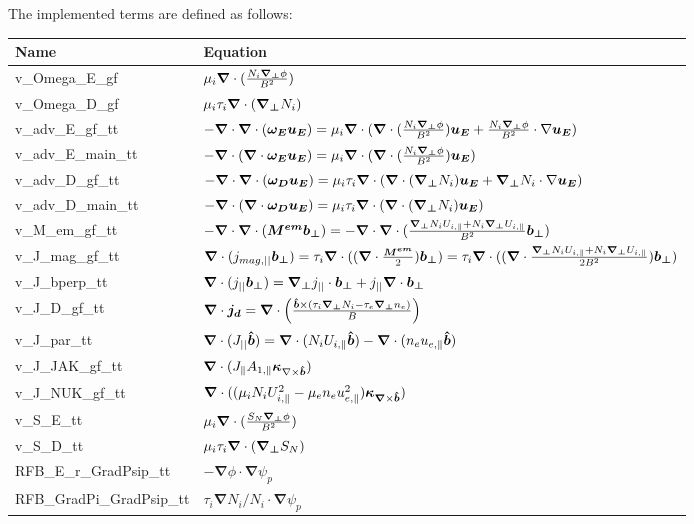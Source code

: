 The implemented terms are defined as follows:
\begin{longtable}{ll}
\toprule
\rowcolor{gray!50}\textbf{Name} &  \textbf{Equation}\\
\midrule
    v\_Omega\_E\_gf &$ \mu_i{\boldsymbol{\nabla}}\cdot(\frac{N_i\boldsymbol{\nabla_\perp}\phi}{B^2})$ \\
    v\_Omega\_D\_gf &$ \mu_i\tau_i {\boldsymbol{\nabla}}\cdot(\boldsymbol{\nabla_\perp} N_i)$ \\
    v\_adv\_E\_gf\_tt &$ -{\boldsymbol{\nabla}}\cdot{\boldsymbol{\nabla}}\cdot(\boldsymbol{\omega_E u_E})=\mu_i{\boldsymbol{\nabla}}\cdot({\boldsymbol{\nabla}}\cdot (\frac{N_i\boldsymbol{\nabla_\perp}\phi}{B^2})\boldsymbol{u_E}+\frac{N_i\boldsymbol{\nabla_\perp}\phi}{B^2}\cdot\nabla \boldsymbol{u_E})  $\\
    v\_adv\_E\_main\_tt &$ -{\boldsymbol{\nabla}}\cdot({\boldsymbol{\nabla}}\cdot\boldsymbol{\omega_E u_E})=\mu_i{\boldsymbol{\nabla}}\cdot({\boldsymbol{\nabla}}\cdot (\frac{N_i\boldsymbol{\nabla_\perp}\phi}{B^2})\boldsymbol{u_E})   $\\
    v\_adv\_D\_gf\_tt &$  -{\boldsymbol{\nabla}}\cdot{\boldsymbol{\nabla}}\cdot(\boldsymbol{\omega_D u_E})=\mu_i\tau_i {\boldsymbol{\nabla}}\cdot({\boldsymbol{\nabla}}\cdot (\boldsymbol{\nabla_\perp} N_i)\boldsymbol{u_E}+\boldsymbol{\nabla_\perp} N_i\cdot\nabla \boldsymbol{u_E})  $\\
    v\_adv\_D\_main\_tt &$  -{\boldsymbol{\nabla}}\cdot({\boldsymbol{\nabla}}\cdot\boldsymbol{\omega_D u_E})=\mu_i\tau_i {\boldsymbol{\nabla}}\cdot({\boldsymbol{\nabla}}\cdot (\boldsymbol{\nabla_\perp} N_i)\boldsymbol{u_E})   $\\
    v\_M\_em\_gf\_tt &$  -{\boldsymbol{\nabla}}\cdot{\boldsymbol{\nabla}}\cdot(\boldsymbol{M^{em}}\boldsymbol{b_\perp})=-{\boldsymbol{\nabla}}\cdot{\boldsymbol{\nabla}}\cdot(\frac{\boldsymbol{\nabla_\perp} N_i U_{i,\parallel}+ N_i\boldsymbol{\nabla_\perp} U_{i,\parallel}}{B^2} \boldsymbol{b_\perp}) $\\
    v\_J\_mag\_gf\_tt &$ {\boldsymbol{\nabla}}\cdot(j_{mag,||}\boldsymbol{b_\perp})=\tau_i{\boldsymbol{\nabla}}\cdot(({\boldsymbol{\nabla}}\cdot\frac{\boldsymbol{M^{em}}}{2})\boldsymbol{b_\perp})=\tau_i{\boldsymbol{\nabla}}\cdot(({\boldsymbol{\nabla}}\cdot\frac{\boldsymbol{\nabla_\perp} N_i U_{i,\parallel}+ N_i\boldsymbol{\nabla_\perp} U_{i,\parallel}}{2B^2})\boldsymbol{b_\perp})  $\\
    v\_J\_bperp\_tt &$ {\boldsymbol{\nabla}}\cdot(j_{||}\boldsymbol{b_\perp})=\boldsymbol{\nabla_\perp} j_{||}\cdot\boldsymbol{b_\perp}+j_{||}{\boldsymbol{\nabla}}\cdot\boldsymbol{b_\perp}  $\\
    v\_J\_D\_gf\_tt &$ {\boldsymbol{\nabla}}\cdot\boldsymbol{j_d}= {\boldsymbol{\nabla}}\cdot\left(\frac{\bm{\hat{b}}\times(\tau_i\boldsymbol{\nabla_\perp} N_i-\tau_e\boldsymbol{\nabla_\perp} n_e)}{B}\right) $\\
    v\_J\_par\_tt &$ {\boldsymbol{\nabla}}\cdot(J_{||}\boldsymbol{\bm{\hat{b}}})={\boldsymbol{\nabla}}\cdot(N_i U_{i,\parallel}\bm{\hat{b}})-{\boldsymbol{\nabla}}\cdot(n_e u_{e,\parallel}\bm{\hat{b}})  $\\
    v\_J\_JAK\_gf\_tt &$ {\boldsymbol{\nabla}}\cdot(J_\parallel A_{1,\parallel}\boldsymbol{\kappa}_{\nabla\times\bm{\hat{b}}})  $\\
    v\_J\_NUK\_gf\_tt &$ {\boldsymbol{\nabla}}\cdot((\mu_iN_iU_{i,\parallel}^2-\mu_en_eu_{e,\parallel}^2)\boldsymbol{\kappa}_{\boldsymbol{\nabla}\times\bm{\hat{b}}})  $\\
    v\_S\_E\_tt &$ \mu_i{\boldsymbol{\nabla}}\cdot(\frac{S_N\boldsymbol{\nabla_\perp}\phi}{B^2})  $\\
    v\_S\_D\_tt &$ \mu_i\tau_i{\boldsymbol{\nabla}}\cdot(\boldsymbol{\nabla_\perp} S_{N})  $\\
    RFB\_E\_r\_GradPsip\_tt &$ -\boldsymbol{\nabla}\phi\cdot\boldsymbol{\nabla}\psi_p  $\\
    RFB\_GradPi\_GradPsip\_tt &$ \tau_i\boldsymbol{\nabla} N_i/N_i\cdot\boldsymbol{\nabla}\psi_p  $\\
    
\bottomrule
\end{longtable}
